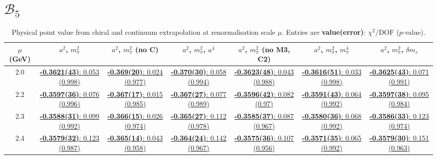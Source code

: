 \documentclass[12pt]{extarticle}
\begin{document}
\section{$\mathcal{B}_5$}
\begin{table}[h!]
\begin{center}
\begin{tabular}{|c|c|c|c|c|c|c|}
\hline
$\mu$ (GeV) & $a^2$, $m_\pi^2$& $a^2$, $m_\pi^2$ (no C)& $a^2$, $m_\pi^2$, $a^4$& $a^2$, $m_\pi^2$ (no M3, C2)& $a^2$, $m_\pi^2$, $m_\pi^4$& $a^2$, $m_\pi^2$, $\delta m_s$\\
\hline
2.0& \hyperlink{TT/NPR/bag_a2m2_20.pdf.1}{\textbf{-0.3621(43)}: 0.053 (0.998)} & \hyperlink{TT/NPR/bag_a2m2noC_20.pdf.1}{\textbf{-0.369(20)}: 0.024 (0.977)} & \hyperlink{TT/NPR/bag_a2a4m2_20.pdf.1}{\textbf{-0.370(30)}: 0.058 (0.994)} & \hyperlink{TT/NPR/bag_a2m2mcut_20.pdf.1}{\textbf{-0.3623(48)}: 0.043 (0.988)} & \hyperlink{TT/NPR/bag_a2m2m4_20.pdf.1}{\textbf{-0.3616(51)}: 0.033 (0.998)} & \hyperlink{TT/NPR/bag_a2m2delm_20.pdf.1}{\textbf{-0.3625(43)}: 0.071 (0.991)}\\
2.2& \hyperlink{TT/NPR/bag_a2m2_22.pdf.1}{\textbf{-0.3597(36)}: 0.076 (0.996)} & \hyperlink{TT/NPR/bag_a2m2noC_22.pdf.1}{\textbf{-0.367(17)}: 0.015 (0.985)} & \hyperlink{TT/NPR/bag_a2a4m2_22.pdf.1}{\textbf{-0.367(27)}: 0.077 (0.989)} & \hyperlink{TT/NPR/bag_a2m2mcut_22.pdf.1}{\textbf{-0.3596(42)}: 0.082 (0.97)} & \hyperlink{TT/NPR/bag_a2m2m4_22.pdf.1}{\textbf{-0.3591(43)}: 0.064 (0.992)} & \hyperlink{TT/NPR/bag_a2m2delm_22.pdf.1}{\textbf{-0.3597(38)}: 0.095 (0.984)}\\
2.3& \hyperlink{TT/NPR/bag_a2m2_23.pdf.1}{\textbf{-0.3588(31)}: 0.099 (0.992)} & \hyperlink{TT/NPR/bag_a2m2noC_23.pdf.1}{\textbf{-0.366(15)}: 0.026 (0.974)} & \hyperlink{TT/NPR/bag_a2a4m2_23.pdf.1}{\textbf{-0.365(27)}: 0.112 (0.978)} & \hyperlink{TT/NPR/bag_a2m2mcut_23.pdf.1}{\textbf{-0.3585(37)}: 0.087 (0.967)} & \hyperlink{TT/NPR/bag_a2m2m4_23.pdf.1}{\textbf{-0.3580(36)}: 0.068 (0.992)} & \hyperlink{TT/NPR/bag_a2m2delm_23.pdf.1}{\textbf{-0.3586(33)}: 0.123 (0.974)}\\
2.4& \hyperlink{TT/NPR/bag_a2m2_24.pdf.1}{\textbf{-0.3579(32)}: 0.123 (0.987)} & \hyperlink{TT/NPR/bag_a2m2noC_24.pdf.1}{\textbf{-0.365(14)}: 0.043 (0.958)} & \hyperlink{TT/NPR/bag_a2a4m2_24.pdf.1}{\textbf{-0.364(24)}: 0.142 (0.967)} & \hyperlink{TT/NPR/bag_a2m2mcut_24.pdf.1}{\textbf{-0.3575(36)}: 0.107 (0.956)} & \hyperlink{TT/NPR/bag_a2m2m4_24.pdf.1}{\textbf{-0.3571(35)}: 0.065 (0.992)} & \hyperlink{TT/NPR/bag_a2m2delm_24.pdf.1}{\textbf{-0.3579(30)}: 0.151 (0.963)}\\
\hline
\end{tabular}
\caption{Physical point value from chiral and continuum extrapolation at renormalisation scale $\mu$. Entries are \textbf{value(error)}: $\chi^2/\text{DOF}$ ($p$-value).}
\end{center}
\end{table}
\end{document}

